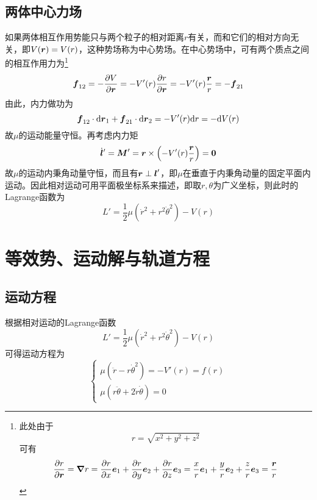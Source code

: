 \subsection{两体中心力场}

如果两体相互作用势能只与两个粒子的相对距离$r$有关，而和它们的相对方向无关，即$V(\boldsymbol{r}) = V(r)$，这种势场称为{\heiti 中心势场}。在中心势场中，可有两个质点之间的相互作用力为\footnote{此处由于\begin{equation*} r = \sqrt{x^2+y^2+z^2} \end{equation*}可有\begin{equation*} \frac{\partial r}{\partial \boldsymbol{r}} = \boldsymbol{\nabla} r = \frac{\partial r}{\partial x}{\boldsymbol{e}_1}+\frac{\partial r}{\partial y}{\boldsymbol{e}_2}+\frac{\partial r}{\partial z}{\boldsymbol{e}_3} = \frac{x}{r}\boldsymbol{e}_1 + \frac{y}{r}\boldsymbol{e}_2 + \frac{z}{r}\boldsymbol{e}_3 = \frac{\boldsymbol{r}}{r} \end{equation*}}
\begin{equation}
	\boldsymbol{f}_{12} = -\frac{\partial V}{\partial \boldsymbol{r}} = -V'(r) \frac{\partial r}{\partial \boldsymbol{r}} = -V'(r) \frac{\boldsymbol{r}}{r} = -\boldsymbol{f}_{21}
\end{equation}
由此，内力做功为
\begin{equation}
	\boldsymbol{f}_{12} \cdot \mathrm{d} \boldsymbol{r}_1 + \boldsymbol{f}_{21} \cdot \mathrm{d} \boldsymbol{r}_2 = -V'(r) \mathrm{d} r = -\mathrm{d} V(r)
\end{equation}
故$\mu$的运动能量守恒。再考虑内力矩
\begin{equation}
	\dot{\boldsymbol{l}}{}' = \boldsymbol{M}' = \boldsymbol{r} \times \left(-V'(r) \frac{\boldsymbol{r}}{r}\right) = \boldsymbol{0}
\end{equation}
故$\mu$的运动内秉角动量守恒，而且有$\boldsymbol{r} \perp \boldsymbol{l}'$，即$\mu$在垂直于内秉角动量的固定平面内运动。因此相对运动可用平面极坐标系来描述，即取$r,\theta$为广义坐标，则此时的Lagrange函数为
\begin{equation}
	L' = \frac12 \mu \left(\dot{r}^2 + r^2 \dot{\theta}^2\right) - V(r)
\end{equation}

\section{等效势、运动解与轨道方程}

\subsection{运动方程}

根据相对运动的Lagrange函数
\begin{equation*}
	L' = \frac12 \mu \left(\dot{r}^2 + r^2 \dot{\theta}^2\right) - V(r)
\end{equation*}
可得运动方程为
\begin{equation}
	\begin{cases}
		\displaystyle \mu \left(\ddot{r}-r\dot{\theta}^2\right) = -V'(r) = f(r) \\
		\displaystyle \mu \left(r\ddot{\theta} + 2\dot{r} \dot{\theta}\right) = 0
	\end{cases}
	\label{两体运动方程}
\end{equation}

